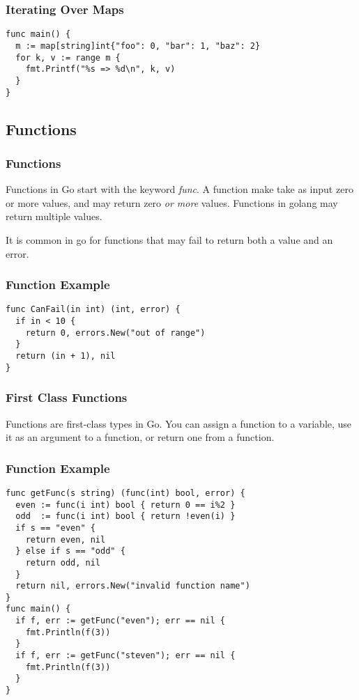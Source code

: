 \documentclass{beamer}
\begin{document}
\begin{frame}[fragile]
  \frametitle{Iterating Over Maps}
\begin{lstlisting}[language=Golang]
func main() {
  m := map[string]int{"foo": 0, "bar": 1, "baz": 2}
  for k, v := range m {
    fmt.Printf("%s => %d\n", k, v)
  }
}
\end{lstlisting}
\end{frame}

\subsection{Functions}

\begin{frame}
  \frametitle{Functions}
  Functions in Go start with the keyword \emph{func}.  A function make
  take as input zero or more values, and may return zero \emph{or
    more} values.  Functions in golang may return multiple values.

  It is common in go for functions that may fail to return both a
  value and an error.
\end{frame}

\begin{frame}[fragile]
  \frametitle{Function Example}
\begin{lstlisting}[language=Golang]
func CanFail(in int) (int, error) {
  if in < 10 {
    return 0, errors.New("out of range")
  }
  return (in + 1), nil
}
\end{lstlisting}
\end{frame}

\begin{frame}
  \frametitle{First Class Functions}
  Functions are first-class types in Go.  You can assign a function to
  a variable, use it as an argument to a function, or return one from
  a function.
\end{frame}

\begin{frame}[fragile]
  \frametitle{Function Example}
\begin{lstlisting}[language=Golang]
func getFunc(s string) (func(int) bool, error) {
  even := func(i int) bool { return 0 == i%2 }
  odd  := func(i int) bool { return !even(i) }
  if s == "even" {
    return even, nil
  } else if s == "odd" {
    return odd, nil
  }
  return nil, errors.New("invalid function name")
}
func main() {
  if f, err := getFunc("even"); err == nil {
    fmt.Println(f(3))
  }
  if f, err := getFunc("steven"); err == nil {
    fmt.Println(f(3))
  }
}
\end{lstlisting}
\end{frame}
\end{document}
